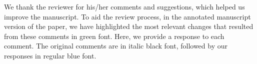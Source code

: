 \documentclass{article}
\begin{document}
\noindent
We thank the reviewer for his/her comments and suggestions, which helped us improve the manuscript. To aid the review process, in the annotated manuscript version of the paper, we have highlighted the most relevant changes that resulted from these comments in green font. Here, we provide a response to each comment. The original comments are in italic black font, followed by our responses in regular blue font.
\vspace{2ex}
\newline

\end{document}
